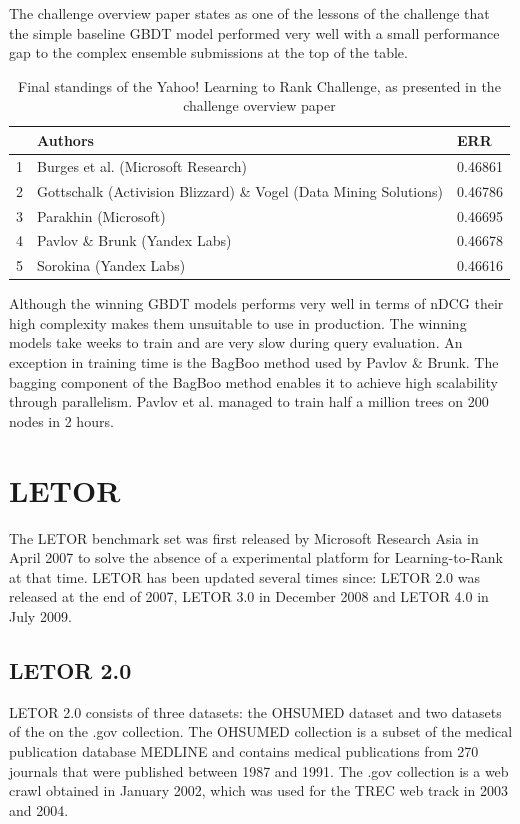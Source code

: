The challenge overview paper \cite{Chapelle2011a} states as one of the lessons of the challenge that the simple baseline \ac{GBDT} model performed very well with a small performance gap to the complex ensemble submissions at the top of the table.\\

\begin{table}
\begin{tabular}{l|p{6.3cm}|l}
 & Authors & ERR \\
 \hline 
1 & Burges et al. (Microsoft Research) & 0.46861 \\ 
2 & Gottschalk (Activision Blizzard) \& Vogel (Data Mining Solutions) & 0.46786 \\ 
3 & Parakhin (Microsoft) & 0.46695 \\ 
4 & Pavlov \& Brunk (Yandex Labs) & 0.46678 \\ 
5 & Sorokina (Yandex Labs) & 0.46616 \\ 
\end{tabular}
\caption{Final standings of the Yahoo! Learning to Rank Challenge, as presented in the challenge overview paper \cite{Chapelle2011a}}
\label{fig:yahoo_results}
\end{table}

Although the winning \ac{GBDT} models performs very well in terms of \ac{nDCG} their high complexity makes them unsuitable to use in production. The winning models take weeks to train and are very slow during query evaluation. An exception in training time is the BagBoo \cite{Pavlov2010} method used by Pavlov \& Brunk. The bagging component of the BagBoo method enables it to achieve high scalability through parallelism. Pavlov et al. \cite{Pavlov2010} managed to train half a million trees on 200 nodes in 2 hours.

\section{LETOR}
The LETOR benchmark set was first released by Microsoft Research Asia in April 2007 \cite{Liu2007b} to solve the absence of a experimental platform for Learning-to-Rank at that time. LETOR has been updated several times since: LETOR 2.0 was released at the end of 2007, LETOR 3.0 \cite{Qin2010} in December 2008 and LETOR 4.0 \cite{Qin2013} in July 2009.

\subsection{LETOR 2.0}
LETOR 2.0 consists of three datasets: the OHSUMED dataset and two datasets of the on the .gov collection. The OHSUMED collection is a subset of the medical publication database MEDLINE and contains medical publications from 270 journals that were published between 1987 and 1991. The .gov collection is a web crawl obtained in January 2002, which was used for the \ac{TREC} web track in 2003 and 2004.\\


